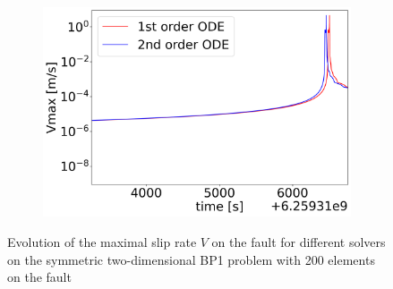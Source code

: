 \begin{figure}[H]
\begin{subfigure}{0.32\textwidth}
    \end{subfigure}
    \begin{subfigure}{0.32\textwidth}
    	\centering
    	\includegraphics[width=1\textwidth]{images/TANDEMcompareFormulationstimeEvolutionVearthquake.png}
    \end{subfigure}
    \caption{Evolution of the maximal slip rate $V$ on the fault for different solvers on the symmetric two-dimensional BP1 problem with 200 elements on the fault}
    \label{fig:timeEvolutionTANDEM_V}
\end{figure}


